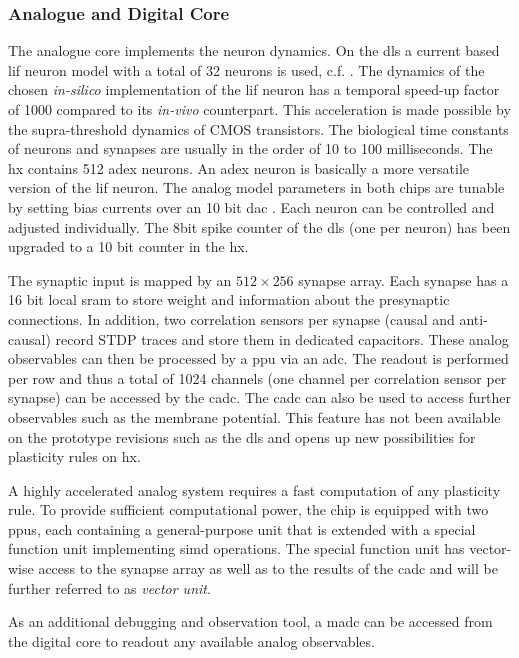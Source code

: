 \subsubsection*{Analogue and Digital Core}
The analogue core implements the neuron dynamics. On the \gls{dls} a current based \gls{lif} neuron model with a total of 32 neurons is used, c.f. \cite{aamir2018dls2neuron}. The dynamics of the chosen \textit{in-silico} implementation of the \gls{lif} neuron has a temporal speed-up factor of 1000 compared to its \textit{in-vivo} counterpart. This acceleration is made possible by the supra-threshold dynamics of CMOS transistors. The biological time constants of neurons and synapses are usually in the order of 10 to 100 milliseconds. The \gls{hx} contains 512 \gls{adex} neurons. An \gls{adex} neuron is basically a more versatile version of the \gls{lif} neuron. The analog model parameters in both chips are tunable by setting bias currents over an 10 bit \gls{dac} \cite{hock13analogmemory}. Each neuron can be controlled and adjusted individually. The 8bit spike counter of the \gls{dls} (one per neuron) has been upgraded to a 10 bit counter in the \gls{hx}. 

The synaptic input is mapped by an $512 \times 256$ synapse array. Each synapse has a 16 bit local \gls{sram} to store weight and information about the presynaptic connections. In addition, two correlation sensors per synapse (causal and anti-causal) record STDP traces and store them in dedicated capacitors. These analog observables can then be processed by a \gls{ppu} via an \gls{adc}. The readout is performed per row and thus a total of 1024 channels (one channel per correlation sensor per synapse) can be accessed by the \gls{cadc}. The \gls{cadc} can also be used to access further observables such as the membrane potential. This feature has not been available on the prototype revisions such as the \gls{dls} and opens up new possibilities for plasticity rules on \gls{hx}.

A highly accelerated analog system requires a fast computation of any plasticity rule. To provide sufficient computational power, the chip is equipped with two \glspl{ppu}, each containing a general-purpose unit that is extended with a special function unit implementing \gls{simd} operations. The special function unit has vector-wise access to the synapse array as well as to the results of the \gls{cadc} and will be further referred to as \textit{vector unit}.

As an additional debugging and observation tool, a \gls{madc} can be accessed from the digital core to readout any available analog observables.

